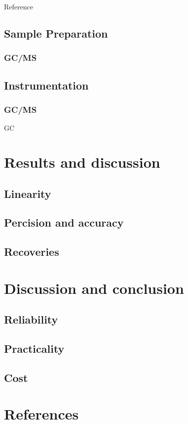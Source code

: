 \documentclass[journal=jacsat,manuscript=article]{achemso}
\begin{document}
Reference 



\subsection{Sample Preparation}
\subsubsection{GC/MS}


\subsection{Instrumentation}
\subsubsection{GC/MS}
GC

\section{Results and discussion}
\subsection{Linearity}
\subsection{Percision and accuracy}
\subsection{Recoveries}

\section{Discussion and conclusion}
\subsection{Reliability}
\subsection{Practicality}
\subsection{Cost}




\section{References}
\end{document}
